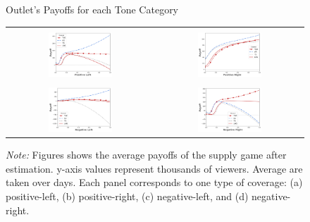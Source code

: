 \documentclass[12pt]{article}
\begin{document}
		\begin{figure}[!htb]
		\caption{Outlet's Payoffs for each Tone Category}
		\centering
		\begin{tabular}{@{}cc@{}}
			\text{(a) Positive Left } &
			\text{(b) Positive Right} \\[0.08em]
			\includegraphics[width=0.45\textwidth]{figures/payoff_pos_left} &
			\includegraphics[width=0.45\textwidth]{figures/payoff_pos_right} \\[1em]
			\text{(c) Negative Left} &
			\text{(d) Negative Right} \\[0.08em]
			\includegraphics[width=0.45\textwidth]{figures/payoff_neg_left} &
			\includegraphics[width=0.45\textwidth]{figures/payoff_neg_right}
		\end{tabular}
		\caption*{\small \textit{Note:} Figures shows the average payoffs of the supply game after estimation. y-axis values represent thousands of viewers. Average are taken over days. Each panel corresponds to one type of coverage: 
			(a) positive-left, (b) positive-right, (c) negative-left, and (d) negative-right.}
		\label{fig:payoffs}
	\end{figure}
	
\end{document}
